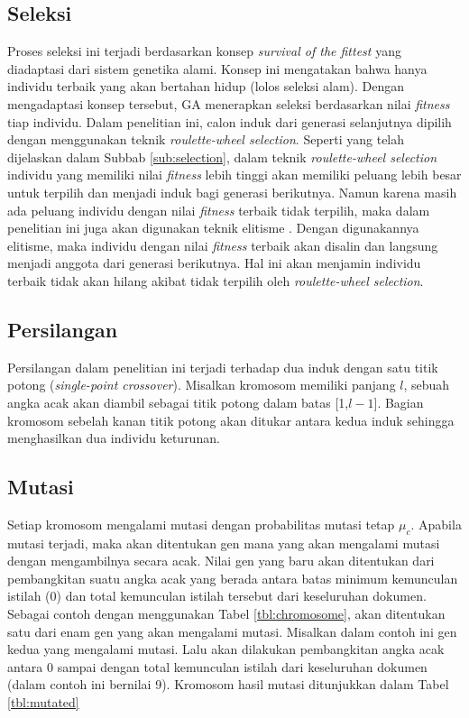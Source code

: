 \subsection{Seleksi}
Proses seleksi ini terjadi berdasarkan konsep \textit{survival of the fittest} yang diadaptasi dari sistem genetika alami. Konsep ini mengatakan bahwa hanya individu terbaik yang akan bertahan hidup (lolos seleksi alam). Dengan mengadaptasi konsep tersebut, GA menerapkan seleksi berdasarkan nilai \textit{fitness} tiap individu. Dalam penelitian ini, calon induk dari generasi selanjutnya dipilih dengan menggunakan teknik \textit{roulette-wheel selection}. Seperti yang telah dijelaskan dalam Subbab \ref{sub:selection}, dalam teknik \textit{roulette-wheel selection} individu yang memiliki nilai \textit{fitness} lebih tinggi akan memiliki peluang lebih besar untuk terpilih dan menjadi induk bagi generasi berikutnya. Namun karena masih ada peluang individu dengan nilai \textit{fitness} terbaik tidak terpilih, maka dalam penelitian ini juga akan digunakan teknik elitisme \cite{ahn2003elitism}. Dengan digunakannya elitisme, maka individu dengan nilai \textit{fitness} terbaik akan disalin dan langsung menjadi anggota dari generasi berikutnya. Hal ini akan menjamin individu terbaik tidak akan hilang akibat tidak terpilih oleh \textit{roulette-wheel selection}.

\subsection{Persilangan}
Persilangan dalam penelitian ini terjadi terhadap dua induk dengan satu titik potong (\textit{single-point crossover}). Misalkan kromosom memiliki panjang $l$, sebuah angka acak akan diambil sebagai titik potong dalam batas [1,$l-1$]. Bagian kromosom sebelah kanan titik potong akan ditukar  antara kedua induk sehingga menghasilkan dua individu keturunan.

\subsection{Mutasi}
Setiap kromosom mengalami mutasi dengan probabilitas mutasi tetap $\mu_c$. Apabila mutasi terjadi, maka akan ditentukan gen mana yang akan mengalami mutasi dengan mengambilnya secara acak. Nilai gen yang baru akan ditentukan dari pembangkitan suatu angka acak yang berada antara batas minimum kemunculan istilah (0) dan total kemunculan istilah tersebut dari keseluruhan dokumen. Sebagai contoh dengan menggunakan Tabel \ref{tbl:chromosome}, akan ditentukan satu dari enam gen yang akan mengalami mutasi. Misalkan dalam contoh ini gen kedua yang mengalami mutasi. Lalu akan dilakukan pembangkitan angka acak antara 0 sampai dengan total kemunculan istilah dari keseluruhan dokumen (dalam contoh ini bernilai 9). Kromosom hasil mutasi ditunjukkan dalam Tabel \ref{tbl:mutated}

